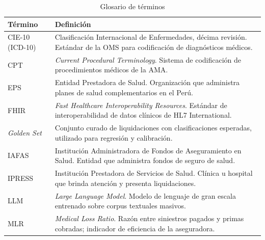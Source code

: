 \anexossection
{} 
\begin{table}[H]
    \centering
    \caption{Glosario de términos}
    \label{tab:glosario-terminos}

    \footnotesize
    \setlength{\tabcolsep}{6pt}
    \renewcommand{\arraystretch}{1.25}

    \begin{tabular}{
        p{}
        p{}
    }
        \toprule
        \textbf{Término}
        & \textbf{Definición} \\
        \midrule

        CIE-10 (ICD-10)
        & Clasificación Internacional de Enfermedades, décima revisión.
          Estándar de la OMS para codificación de diagnósticos médicos. \\

        CPT
        & \textit{Current Procedural Terminology}. Sistema de codificación
          de procedimientos médicos de la AMA. \\

        EPS
        & Entidad Prestadora de Salud. Organización que administra planes
          de salud complementarios en el Perú. \\

        FHIR
        & \textit{Fast Healthcare Interoperability Resources}. Estándar de
          interoperabilidad de datos clínicos de HL7 International. \\

        \textit{Golden Set}
        & Conjunto curado de liquidaciones con clasificaciones esperadas,
          utilizado para regresión y calibración. \\

        IAFAS
        & Institución Administradora de Fondos de Aseguramiento en Salud.
          Entidad que administra fondos de seguro de salud. \\

        IPRESS
        & Institución Prestadora de Servicios de Salud. Clínica u hospital
          que brinda atención y presenta liquidaciones. \\

        LLM
        & \textit{Large Language Model}. Modelo de lenguaje de gran escala
          entrenado sobre corpus textuales masivos. \\

        MLR
        & \textit{Medical Loss Ratio}. Razón entre siniestros pagados y primas
          cobradas; indicador de eficiencia de la aseguradora. \\


\end{tabular}
\end{table}
